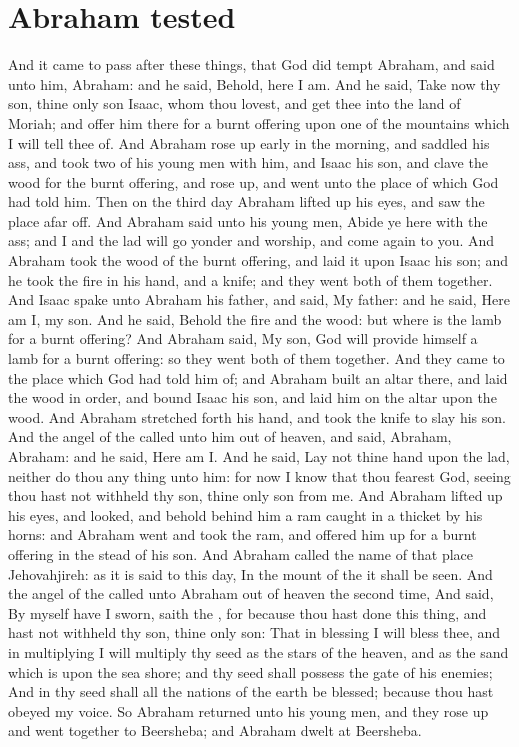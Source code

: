 \section*{Abraham tested}
\begin{biblechapter} %
\verse And it came to pass after these things, that God did tempt Abraham, and said unto him, Abraham: and he said, Behold, here I am.
\verse And he said, Take now thy son, thine only son Isaac, whom thou lovest, and get thee into the land of Moriah; and offer him there for a burnt offering upon one of the mountains which I will tell thee of.
\verse And Abraham rose up early in the morning, and saddled his ass, and took two of his young men with him, and Isaac his son, and clave the wood for the burnt offering, and rose up, and went unto the place of which God had told him.
\verse Then on the third day Abraham lifted up his eyes, and saw the place afar off.
\verse And Abraham said unto his young men, Abide ye here with the ass; and I and the lad will go yonder and worship, and come again to you.
\verse And Abraham took the wood of the burnt offering, and laid it upon Isaac his son; and he took the fire in his hand, and a knife; and they went both of them together.
\verse And Isaac spake unto Abraham his father, and said, My father: and he said, Here am I, my son. And he said, Behold the fire and the wood: but where is the lamb for a burnt offering?
\verse And Abraham said, My son, God will provide himself a lamb for a burnt offering: so they went both of them together.
\verse And they came to the place which God had told him of; and Abraham built an altar there, and laid the wood in order, and bound Isaac his son, and laid him on the altar upon the wood.
\verse And Abraham stretched forth his hand, and took the knife to slay his son.
\verse And the angel of the \LORD called unto him out of heaven, and said, Abraham, Abraham: and he said, Here am I.
\verse And he said, Lay not thine hand upon the lad, neither do thou any thing unto him: for now I know that thou fearest God, seeing thou hast not withheld thy son, thine only son from me.
\verse And Abraham lifted up his eyes, and looked, and behold behind him a ram caught in a thicket by his horns: and Abraham went and took the ram, and offered him up for a burnt offering in the stead of his son.
\verse And Abraham called the name of that place Jehovahjireh: as it is said to this day, In the mount of the \LORD it shall be seen.
\verse And the angel of the \LORD called unto Abraham out of heaven the second time,
\verse And said, By myself have I sworn, saith the \LORD, for because thou hast done this thing, and hast not withheld thy son, thine only son:
\verse That in blessing I will bless thee, and in multiplying I will multiply thy seed as the stars of the heaven, and as the sand which is upon the sea shore; and thy seed shall possess the gate of his enemies;
\verse And in thy seed shall all the nations of the earth be blessed; because thou hast obeyed my voice.
\verse So Abraham returned unto his young men, and they rose up and went together to Beersheba; and Abraham dwelt at Beersheba.

\end{biblechapter}
